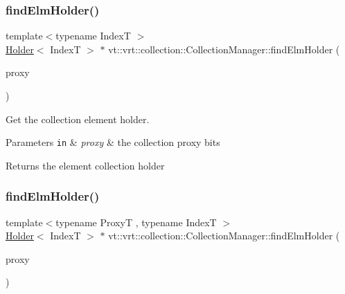 \subsubsection{\texorpdfstring{find\+Elm\+Holder()}{findElmHolder()}\hspace{0.1cm}{\footnotesize\ttfamily [1/2]}}
{\footnotesize\ttfamily template$<$typename IndexT $>$ \\
\hyperlink{structvt_1_1vrt_1_1collection_1_1_holder}{Holder}$<$ IndexT $>$ $\ast$ vt\+::vrt\+::collection\+::\+Collection\+Manager\+::find\+Elm\+Holder (\begin{DoxyParamCaption}\item[{\hyperlink{namespacevt_a1b417dd5d684f045bb58a0ede70045ac}{Virtual\+Proxy\+Type} const \&}]{proxy }\end{DoxyParamCaption})\hspace{0.3cm}{\ttfamily [private]}}



Get the collection element holder. 


\begin{DoxyParams}[1]{Parameters}
\mbox{\tt in}  & {\em proxy} & the collection proxy bits\\
\hline
\end{DoxyParams}
\begin{DoxyReturn}{Returns}
the element collection holder 
\end{DoxyReturn}
\mbox{\label{structvt_1_1vrt_1_1collection_1_1_collection_manager_a9358387d86de8983cdbf3db982da7041}} 
\subsubsection{\texorpdfstring{find\+Elm\+Holder()}{findElmHolder()}\hspace{0.1cm}{\footnotesize\ttfamily [2/2]}}
{\footnotesize\ttfamily template$<$typename ProxyT , typename IndexT $>$ \\
\hyperlink{structvt_1_1vrt_1_1collection_1_1_holder}{Holder}$<$ IndexT $>$ $\ast$ vt\+::vrt\+::collection\+::\+Collection\+Manager\+::find\+Elm\+Holder (\begin{DoxyParamCaption}\item[{ProxyT}]{proxy }\end{DoxyParamCaption})\hspace{0.3cm}{\ttfamily [private]}}



